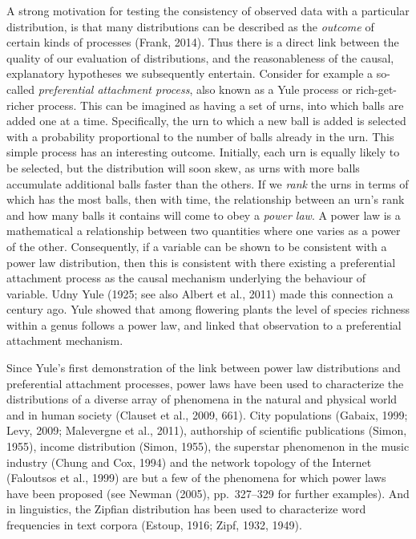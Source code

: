 A strong motivation for testing the consistency of observed data with a particular distribution, is that many distributions can be described as the \emph{outcome} of certain kinds of processes (Frank, 2014). Thus there is a direct link between the quality of our evaluation of distributions, and the reasonableness of the causal, explanatory hypotheses we subsequently entertain. Consider for example a so-called \emph{preferential attachment process}, also known as a Yule process or rich-get-richer process. This can be imagined as having a set of urns, into which balls are added one at a time. Specifically, the urn to which a new ball is added is selected with a probability proportional to the number of balls already in the urn. This simple process has an interesting outcome. Initially, each urn is equally likely to be selected, but the distribution will soon skew, as urns with more balls accumulate additional balls faster than the others. If we \emph{rank} the urns in terms of which has the most balls, then with time, the relationship between an urn's rank and how many balls it contains will come to obey a \emph{power law}. A power law is a mathematical a relationship between two quantities where one varies as a power of the other. Consequently, if a variable can be shown to be consistent with a power law distribution, then this is consistent with there existing a preferential attachment process as the causal mechanism underlying the behaviour of variable. Udny Yule (1925; see also Albert et al., 2011) made this connection a century ago. Yule showed that among flowering plants the level of species richness within a genus follows a power law, and linked that observation to a preferential attachment mechanism.

Since Yule's first demonstration of the link between power law distributions and preferential attachment processes, power laws have been used to characterize the distributions of a diverse array of phenomena in the natural and physical world and in human society (Clauset et al., 2009, 661). City populations (Gabaix, 1999; Levy, 2009; Malevergne et al., 2011), authorship of scientific publications (Simon, 1955), income distribution (Simon, 1955), the superstar phenomenon in the music industry (Chung and Cox, 1994) and the network topology of the Internet (Faloutsos et al., 1999) are but a few of the phenomena for which power laws have been proposed (see Newman (2005), pp.~327--329 for further examples). And in linguistics, the Zipfian distribution has been used to characterize word frequencies in text corpora (Estoup, 1916; Zipf, 1932, 1949).

